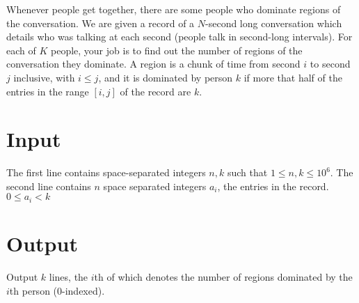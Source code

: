 
Whenever people get together, there are some people who dominate regions of the conversation.
We are given a record of a $N$-second long conversation which details who was talking at each second
(people talk in second-long intervals). For each of $K$ people, your job is to find out the number of
regions of the conversation they dominate. A region is a chunk of time from second $i$ to second $j$
inclusive, with $i \leq j$, and it is dominated by person $k$ if more that half of the entries in
the range $[i,j]$ of the record are $k$.

\section*{Input}
The first line contains space-separated integers $n,k$ such that $1 \leq n,k \leq 10^6$.
The second line contains $n$ space separated integers $a_i$, the entries in the record. $0 \leq a_i < k$

\section*{Output}
Output $k$ lines, the $i$th of which denotes the number of regions dominated by the $i$th person ($0$-indexed).

